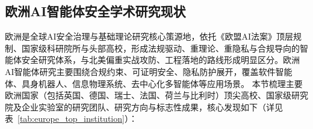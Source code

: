 \subsection{欧洲AI智能体安全学术研究现状}
欧洲是全球AI安全治理与基础理论研究核心策源地，依托《欧盟AI法案》顶层规制、国家级科研院所与头部高校，形成法规驱动、重理论、重隐私与合规导向的智能体安全研究体系，与北美偏重实战攻防、工程落地的路线形成明显区分。欧洲AI智能体研究主要围绕合规约束、可证明安全、隐私防护展开，覆盖软件智能体、具身机器人、信息物理系统、去中心化多智能体等应用场景\cite{mpiEUAIAct2026}。
本节梳理主要欧洲国家（包括英国、德国、瑞士、法国、荷兰与比利时）顶尖高校、国家级研究院及企业实验室的研究团队、研究方向与标志性成果，核心发现如下（详见表~\ref{tab:europe_top_institution}）：

